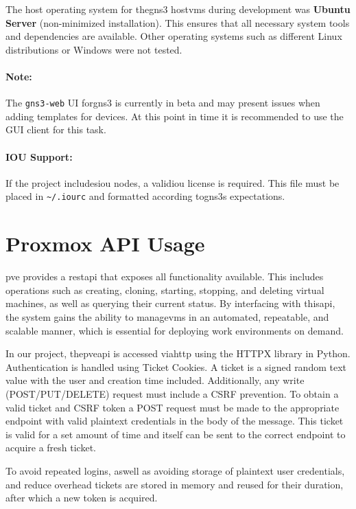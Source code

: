     The host operating system for the\ac{gns3} host\ac{vm}s during development was \textbf{Ubuntu Server} (non-minimized 
    installation). This ensures that all necessary system tools and dependencies are available. Other operating systems 
    such as different Linux distributions or Windows were not tested.    

    \paragraph{Note:} The \texttt{gns3-web} UI for\ac{gns3} is currently in beta and may present issues when adding 
    templates for devices. At this point in time it is recommended to use the GUI client for this task.

    \paragraph{IOU Support:} If the project includes\ac{iou} nodes, a valid\ac{iou} license is required. This file must be 
    placed in \texttt{\textasciitilde{}/.iourc} and formatted according to\ac{gns3}s expectations.

\section{Proxmox API Usage}

    \ac{pve} provides a \ac{rest}\ac{api} that exposes all functionality available. This includes operations such as 
    creating, cloning, starting, stopping, and deleting virtual machines, as well as querying their current status. 
    By interfacing with this\ac{api}, the system gains the ability to manage\ac{vm}s in an automated, repeatable, and 
    scalable manner, which is essential for deploying work environments on demand.

    In our project, the\ac{pve}\ac{api} is accessed via\ac{http} using the HTTPX library in Python. 
    Authentication is handled using Ticket Cookies. A ticket is a signed random text value with the user and creation 
    time included. Additionally, any write (POST/PUT/DELETE) request must include a CSRF prevention. To obtain a valid 
    ticket and CSRF token a POST request must be made to the appropriate endpoint with valid plaintext credentials in the 
    body of the message. This ticket is valid for a set amount of time and itself can be sent to the correct endpoint to 
    acquire a fresh ticket.

    To avoid repeated logins, aswell as avoiding storage of plaintext user credentials, and reduce overhead tickets are 
    stored in memory and reused for their duration, after which a new token is acquired.

